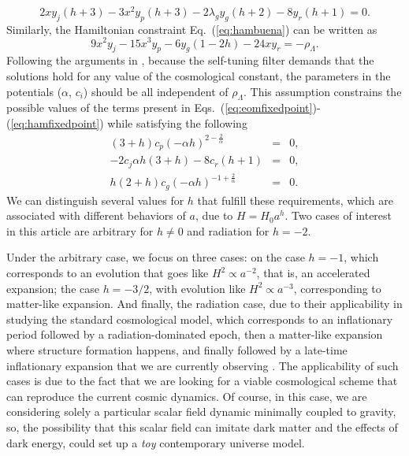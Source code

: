 \documentclass[onecolumn,superscriptaddress,secnumarabic,amssymb,amsmath,nobibnotes,aps,prd,nofootinbib,altaffilletter]{revtex4}
\begin{document}
\begin{equation}
    2xy_j(h+3) - 3x^2y_p(h+3)-2\lambda_gy_g(h+2) - 8y_r(h+1)=0.
    \label{eq:eomfixedpoint}
\end{equation}
Similarly, the Hamiltonian constraint Eq.~(\ref{eq:hambuena}) can be written as
\begin{equation}
    9x^2y_j - 15x^3y_p - 6y_g(1-2h)-24xy_r = -\rho_{\Lambda}.
    \label{eq:hamfixedpoint}
\end{equation}
Following the arguments in \cite{Copeland:2012qf}, because the self-tuning filter demands that the solutions hold for any value of the cosmological constant, the parameters in the potentials ($\alpha$, $c_i$) should be all independent of $\rho_{\Lambda}$. This assumption constrains the possible values of the terms present in Eqs.~(\ref{eq:eomfixedpoint})-(\ref{eq:hamfixedpoint}) while satisfying the following 
\begin{eqnarray}
    (3+h)c_p(-\alpha h)^{2-\frac{2}{\alpha}}&=&0, \label{eq:constraint1}\\
    -2c_j\alpha h (3+h) - 8c_r(h+1)&=&0, \label{eq:constraint2}\\
    h(2+h)c_g(-\alpha h)^{-1+\frac{2}{\alpha}}&=&0. \label{eq:constraint3}
\end{eqnarray}
We can distinguish several values for $h$ that fulfill these requirements, which are associated with different behaviors of $a$, due to $H=H_0 a^h$. Two cases of interest in this article are arbitrary for $h\neq 0$ and radiation for $h=-2$.

Under the arbitrary case, we focus on three cases:
on the case $h=-1$, which corresponds to an evolution that goes like $H^2\propto a^{-2}$, that is, an accelerated expansion; the case $h=-3/2$, with evolution like $H^2\propto a^{-3}$, corresponding to matter-like expansion. And finally, the radiation case, due to their applicability in studying the standard cosmological model, which corresponds to an inflationary period followed by a radiation-dominated epoch, then a matter-like expansion where structure formation happens, and finally followed by a late-time inflationary expansion that we are currently observing \cite{dodelson_schmidt_2021}. The applicability of such cases is due to the fact that we are looking for a viable cosmological scheme that can reproduce the current cosmic dynamics. Of course, in this case, we are considering solely a particular scalar field dynamic minimally coupled to gravity, so, the possibility that this scalar field can imitate dark matter and the effects of dark energy, could set up a \textit{toy} contemporary universe model. 
\end{document}
